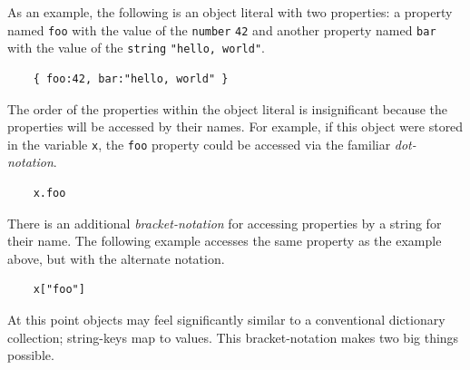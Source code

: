 \documentclass[11pt,letter]{book}
\begin{document}
    As an example, the following is an object literal with two properties: a property named 
    \texttt{foo} with the value of the \texttt{number} \texttt{42} and another property named 
    \texttt{bar} with the value of the \texttt{string} \texttt{"hello, world"}.
    
    \begin{verbatim}
    { foo:42, bar:"hello, world" }
    \end{verbatim}
    
    The order of the properties within the object literal is insignificant because the properties
    will be accessed by their names. For example, if this object were stored in the variable 
    \texttt{x}, the \texttt{foo} property could be accessed via the familiar \emph{dot-notation}.
    
    \begin{verbatim}
    x.foo
    \end{verbatim}
    
    There is an additional \emph{bracket-notation} for accessing properties by a string for their 
    name. The following example accesses the same property as the example above, but with the 
    alternate notation.
    
    \begin{verbatim}
    x["foo"]
    \end{verbatim}
    
    At this point objects may feel significantly similar to a conventional dictionary collection;
    string-keys map to values. This bracket-notation makes two big things possible. 
    
\end{document}
